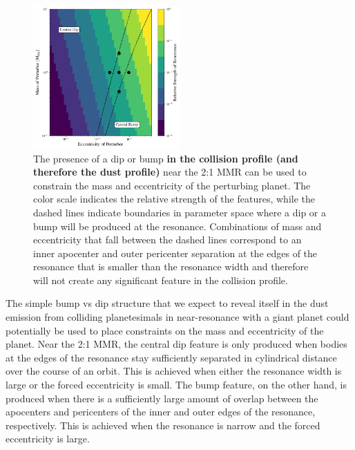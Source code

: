 \documentclass[fleqn,usenatbib]{mnras}
\begin{document}
\begin{figure}
\begin{center}
    \includegraphics[width=0.5\textwidth]{figures/bump_dip_diag.png}
    \caption{The presence of a dip or bump \textbf{in the collision profile (and therefore the dust profile)} near the 2:1 MMR can be used to constrain the mass and eccentricity
    of the perturbing planet. The color scale indicates the relative strength of the features, while the dashed lines
    indicate boundaries in parameter space where a dip or a bump will be produced at the resonance. Combinations of mass and eccentricity that fall 
    between the dashed lines correspond to an inner apocenter and outer pericenter separation at the edges of the resonance that is smaller than the 
    resonance width and therefore will not create any significant feature in the collision profile.\label{fig:bump_dip_diag}}
\end{center}
\end{figure}

The simple bump vs dip structure that we expect to reveal itself in the dust emission from colliding planetesimals in near-resonance with a giant 
planet could potentially be used to place constraints on the mass and eccentricity of the planet. Near the 2:1 MMR, the central dip feature is only 
produced when bodies at the edges of the resonance stay sufficiently separated in cylindrical distance over the course of an orbit. This is achieved 
when either the resonance width is large or the forced eccentricity is small. The bump feature, on the other hand, is produced when there is a 
sufficiently large amount of overlap between the apocenters and pericenters of the inner and outer edges of the resonance, respectively. This is 
achieved when the resonance is narrow and the forced eccentricity is large.
\end{document}
